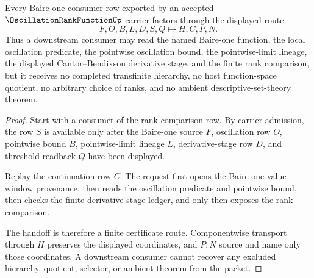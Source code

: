 \begin{theorem}
\label{thm:oscillation-rank-function-baire-one-handoff}
Every Baire-one consumer row exported by an accepted $\OscillationRankFunctionUp$ carrier factors through the displayed route
$$
F,O,B,L,D,S,Q \longmapsto H,C,P,N .
$$
Thus a downstream consumer may read the named Baire-one function, the local oscillation predicate, the pointwise oscillation bound, the pointwise-limit lineage, the displayed Cantor--Bendixson derivative stage, and the finite rank comparison, but it receives no completed transfinite hierarchy, no host function-space quotient, no arbitrary choice of ranks, and no ambient descriptive-set-theory theorem.
\end{theorem}
\begin{proof}
Start with a consumer of the rank-comparison row. By carrier admission, the row $S$ is available only after the Baire-one source $F$, oscillation row $O$, pointwise bound $B$, pointwise-limit lineage $L$, derivative-stage row $D$, and threshold readback $Q$ have been displayed.

Replay the continuation row $C$. The request first opens the Baire-one value-window provenance, then reads the oscillation predicate and pointwise bound, then checks the finite derivative-stage ledger, and only then exposes the rank comparison.

The handoff is therefore a finite certificate route. Componentwise transport through $H$ preserves the displayed coordinates, and $P,N$ source and name only those coordinates. A downstream consumer cannot recover any excluded hierarchy, quotient, selector, or ambient theorem from the packet.
\end{proof}

\begin{closurestatus}{\OscillationRankFunctionUp}
  \theoryclosure{\seedClosure}
  \formalstatus{\unformalizedV}
\end{closurestatus}
